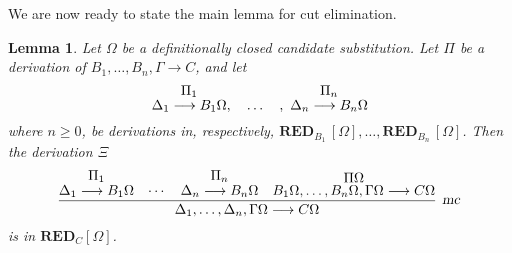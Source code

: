 \documentclass[preprint]{elsarticle}
\newcommand{\Seq}[2]{#1\longrightarrow #2}
\newcommand{\mc}{\hbox{\sl mc}}
\def\RED{{\mathbf{RED}}}
\newtheorem{lemma}[thm]{Lemma}
\begin{document}
We are now ready to state the main lemma for cut elimination.

\begin{lemma}
  \label{lm:comp}
  Let $\Omega$ be a definitionally closed candidate substitution.  Let
  $\Pi$ be a derivation of $\Seq{B_1,\ldots,B_n,\Gamma}{C}$, and let
$$
\deduce{\Seq{\Delta_1}{B_1\Omega}}{\Pi_1}, \quad \ldots
\quad,~\deduce{\Seq{\Delta_n}{B_n\Omega}}{\Pi_n} 
$$
where $n \geq 0$, be derivations in, respectively,
$\RED_{B_1}\, [\Omega], \ldots, \RED_{B_n}\, [\Omega]$.  Then the derivation
$\Xi$
\begin{displaymath}
  \infer[\mc]{\Seq{\Delta_1,\ldots,\Delta_n,\Gamma\Omega}{C\Omega}}
  {\deduce{\Seq{\Delta_1}{B_1\Omega}}
    {\Pi_1}
    & \cdots
    & \deduce{\Seq{\Delta_n}{B_n\Omega}}
    {\Pi_n}
    & \deduce{\Seq{B_1\Omega,\ldots,B_n\Omega,\Gamma\Omega}{C\Omega}}
    {\Pi\Omega}}
\end{displaymath}
is in $\RED_{C}[\Omega]$.
\end{lemma}
\end{document}

